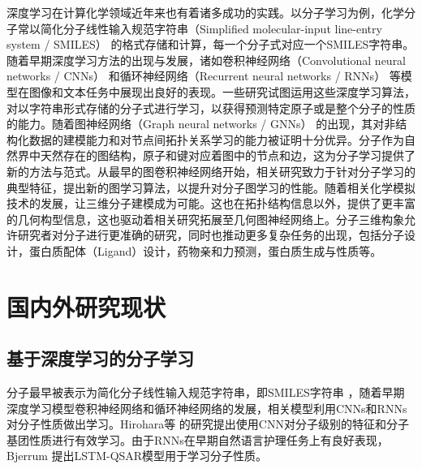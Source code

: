 深度学习在计算化学领域近年来也有着诸多成功的实践。以分子学习为例，化学分子常以简化分子线性输入规范字符串（Simplified molecular-input line-entry system / SMILES） \cite{smiles_weinberger_88}的格式存储和计算，每一个分子式对应一个SMILES字符串。随着早期深度学习方法的出现与发展，诸如卷积神经网络（Convolutional neural networks / CNNs） \cite{cnnsmiles_hirohara_18}和循环神经网络（Recurrent neural networks / RNNs） \cite{rnnsmiles_bjerrum_17,practicalmodel_liu_19,deeppurpose_huang_20}等模型在图像和文本任务中展现出良好的表现。一些研究试图运用这些深度学习算法，对以字符串形式存储的分子式进行学习，以获得预测特定原子或是整个分子的性质的能力。随着图神经网络（Graph neural networks / GNNs） \cite{semisupervised_kipf_17,inductive_hamilton_17,howpowerful_xu_18}的出现，其对非结构化数据的建模能力和对节点间拓扑关系学习的能力被证明十分优异。分子作为自然界中天然存在的图结构，原子和键对应着图中的节点和边，这为分子学习提供了新的方法与范式。从最早的图卷积神经网络开始，相关研究致力于针对分子学习的典型特征，提出新的图学习算法，以提升对分子图学习的性能。随着相关化学模拟技术的发展，让三维分子建模成为可能。这也在拓扑结构信息以外，提供了更丰富的几何构型信息，这也驱动着相关研究拓展至几何图神经网络上。分子三维构象允许研究者对分子进行更准确的研究，同时也推动更多复杂任务的出现，包括分子设计，蛋白质配体（Ligand）设计，药物亲和力预测，蛋白质生成与性质等。


\section{国内外研究现状}
\subsection{基于深度学习的分子学习}
分子最早被表示为简化分子线性输入规范字符串，即SMILES字符串  \cite{smiles_weinberger_88}，随着早期深度学习模型卷积神经网络和循环神经网络的发展，相关模型利用CNNs和RNNs对分子性质做出学习。Hirohara等 \cite{cnnsmiles_hirohara_18}的研究提出使用CNN对分子级别的特征和分子基团性质进行有效学习。由于RNNs在早期自然语言护理任务上有良好表现，Bjerrum \cite{rnnsmiles_bjerrum_17}提出LSTM-QSAR模型用于学习分子性质。

